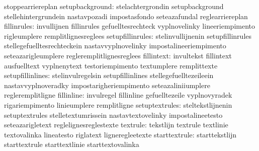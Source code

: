                                   stoppearriereplan
                 setupbackground: stelachtergrondin                setupbackground
                                  stellehintergrundein             nastavpozadi
                                  impostasfondo                    seteazafundal
                                  reglearriereplan
                     fillinrules: invullijnen                      fillinrules
                                  gefuelltesrechteck               vyplnovelinky %
                                  lineeriempimento                 rigleumplere
                                  remplitlignesreglees
                setupfillinrules: stelinvullijnenin                setupfillinrules
                                  stellegefuelltesrechteckein      nastavvyplnovelinky
                                  impostalineeriempimento          seteazarigleumplere
                                  regleremplitlignesreglees
                      fillintext: invultekst                       fillintext
                                  ausfuelltext                     vyplnenytext
                                  testoriempimento                 textumplere
                                  remplittexte
                setupfillinlines: stelinvulregelsin                setupfillinlines
                                  stellegefuelltezeileein          nastavvyplnoveradky
                                  impostarigheriempimento          seteazaliniiumplere
                                  regleremplitligne
                      fillinline: invulregel                       fillinline
                                  gefuelltezeile                   vyplnovyradek
                                  rigariempimento                  linieumplere
                                  remplitligne
                  setuptextrules: steltekstlijnenin                setuptextrules
                                  stelletextumrissein              nastavtextovelinky
                                  impostalineetesto                seteazarigletext
                                  reglelignesreglestexte
                        textrule: tekstlijn                        textrule
                                  textlinie                        textovalinka
                                  lineatesto                       riglatext
                                  ligneregleetexte
                   starttextrule: starttekstlijn                   starttextrule
                                  starttextlinie                   starttextovalinka
